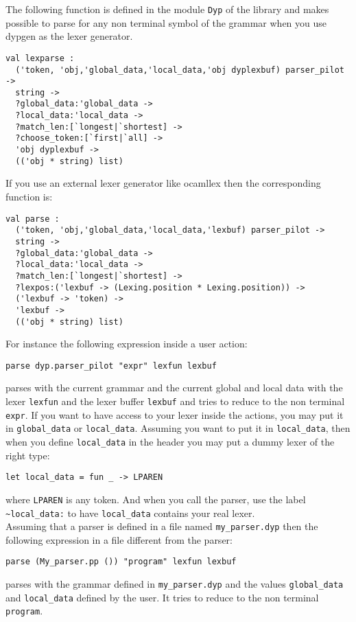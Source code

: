 \documentclass[12pt]{article}
\begin{document}
{The following function is defined in the module \verb|Dyp| of the library and makes possible to parse for any non terminal symbol of the grammar when you use dypgen as the lexer generator.
\begin{verbatim}
val lexparse :
  ('token, 'obj,'global_data,'local_data,'obj dyplexbuf) parser_pilot ->
  string ->
  ?global_data:'global_data ->
  ?local_data:'local_data ->
  ?match_len:[`longest|`shortest] ->
  ?choose_token:[`first|`all] ->
  'obj dyplexbuf ->
  (('obj * string) list)
\end{verbatim}
If you use an external lexer generator like ocamllex then the corresponding function is:
\begin{verbatim}
val parse :
  ('token, 'obj,'global_data,'local_data,'lexbuf) parser_pilot ->
  string ->
  ?global_data:'global_data ->
  ?local_data:'local_data ->
  ?match_len:[`longest|`shortest] ->
  ?lexpos:('lexbuf -> (Lexing.position * Lexing.position)) ->
  ('lexbuf -> 'token) ->
  'lexbuf ->
  (('obj * string) list)
\end{verbatim}
For instance the following expression inside a user action:
\begin{verbatim}
parse dyp.parser_pilot "expr" lexfun lexbuf
\end{verbatim}
parses with the current grammar and the current global and local data with the lexer \verb|lexfun| and the lexer buffer \verb|lexbuf| and tries to reduce to the non terminal \verb|expr|. If you want to have access to your lexer inside the actions, you may put it in \verb|global_data| or \verb|local_data|. Assuming you want to put it in \verb|local_data|, then when you define  \verb|local_data| in the header you may put a dummy lexer of the right type:
\begin{verbatim}
let local_data = fun _ -> LPAREN
\end{verbatim}
where \verb|LPAREN| is any token. And when you call the parser, use the label \verb|~local_data:| to have \verb|local_data| contains your real lexer.\\

Assuming that a parser is defined in a file named \verb|my_parser.dyp| then the following expression in a file different from the parser:
\begin{verbatim}
parse (My_parser.pp ()) "program" lexfun lexbuf
\end{verbatim}
parses with the grammar defined in \verb|my_parser.dyp| and the values \verb|global_data| and \verb|local_data| defined by the user. It tries to reduce to the non terminal \verb|program|.\\

}
\end{document}
